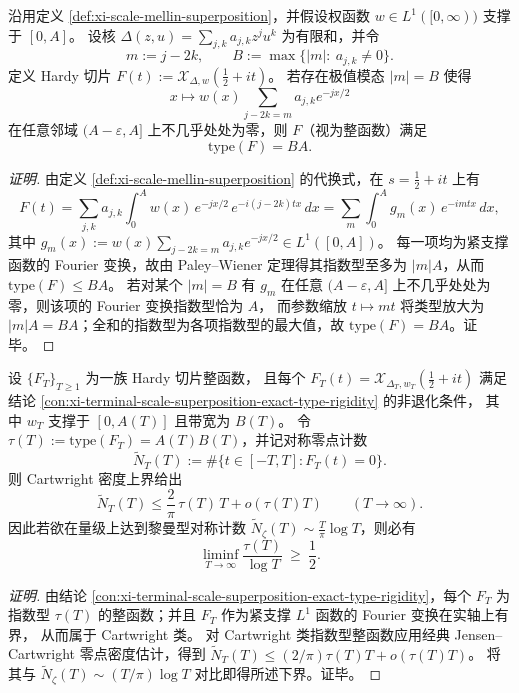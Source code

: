 \begin{conclusion}\label{con:xi-terminal-scale-superposition-exact-type-rigidity}
沿用定义 \ref{def:xi-scale-mellin-superposition}，并假设权函数 \(w\in L^{1}([0,\infty))\) 支撑于 \([0,A]\)。
设核 \(\Delta(z,u)=\sum_{j,k}a_{j,k}z^{j}u^{k}\) 为有限和，并令
\[
m:=j-2k,\qquad
B:=\max\{|m|:\ a_{j,k}\neq 0\}.
\]
定义 Hardy 切片
\(
F(t):=\mathcal X_{\Delta,w}(\tfrac12+it)
\)。
若存在极值模态 \(|m|=B\) 使得
\[
x\longmapsto w(x)\sum_{j-2k=m}a_{j,k}e^{-jx/2}
\]
在任意邻域 \((A-\varepsilon,A]\) 上不几乎处处为零，则 \(F\)（视为整函数）满足
\[
\mathrm{type}(F)=BA.
\]
\end{conclusion}
\begin{proof}[证明]
由定义 \ref{def:xi-scale-mellin-superposition} 的代换式，在 \(s=\tfrac12+it\) 上有
\[
F(t)=\sum_{j,k}a_{j,k}\int_{0}^{A} w(x)\,e^{-jx/2}\,e^{-i(j-2k)tx}\,dx
=\sum_{m}\int_{0}^{A} g_m(x)\,e^{-imtx}\,dx,
\]
其中
\(
g_m(x):=w(x)\sum_{j-2k=m}a_{j,k}e^{-jx/2}\in L^{1}([0,A])
\)。
每一项均为紧支撑函数的 Fourier 变换，故由 Paley--Wiener 定理得其指数型至多为 \(|m|A\)，从而 \(\mathrm{type}(F)\le BA\)。
若对某个 \(|m|=B\) 有 \(g_m\) 在任意 \((A-\varepsilon,A]\) 上不几乎处处为零，则该项的 Fourier 变换指数型恰为 \(A\)，
而参数缩放 \(t\mapsto mt\) 将类型放大为 \(|m|A=BA\)；全和的指数型为各项指数型的最大值，故 \(\mathrm{type}(F)=BA\)。证毕。
\end{proof}

\begin{conclusion}\label{con:xi-terminal-zero-density-product-lower-bound}
设 \(\{F_T\}_{T\ge 1}\) 为一族 Hardy 切片整函数，
且每个 \(F_T(t)=\mathcal X_{\Delta_T,w_T}(\tfrac12+it)\) 满足结论 \ref{con:xi-terminal-scale-superposition-exact-type-rigidity} 的非退化条件，
其中 \(w_T\) 支撑于 \([0,A(T)]\) 且带宽为 \(B(T)\)。
令
\(
\tau(T):=\mathrm{type}(F_T)=A(T)B(T)
\)，并记对称零点计数
\[
\widetilde N_T(T):=\#\{t\in[-T,T]:F_T(t)=0\}.
\]
则 Cartwright 密度上界给出
\[
\widetilde N_T(T)\le \frac{2}{\pi}\,\tau(T)\,T+o(\tau(T)T)\qquad(T\to\infty).
\]
因此若欲在量级上达到黎曼型对称计数 \(\widetilde N_\zeta(T)\sim \frac{T}{\pi}\log T\)，则必有
\[
\liminf_{T\to\infty}\frac{\tau(T)}{\log T}\ \ge\ \frac12.
\]
\end{conclusion}
\begin{proof}[证明]
由结论 \ref{con:xi-terminal-scale-superposition-exact-type-rigidity}，每个 \(F_T\) 为指数型 \(\tau(T)\) 的整函数；并且 \(F_T\) 作为紧支撑 \(L^1\) 函数的 Fourier 变换在实轴上有界，
从而属于 Cartwright 类。
对 Cartwright 类指数型整函数应用经典 Jensen--Cartwright 零点密度估计，得到
\(
\widetilde N_T(T)\le (2/\pi)\tau(T)T+o(\tau(T)T)
\)。
将其与 \(\widetilde N_\zeta(T)\sim (T/\pi)\log T\) 对比即得所述下界。证毕。
\end{proof}

